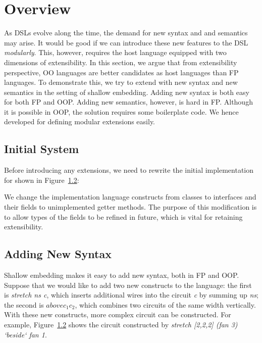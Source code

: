 \section{Overview}

\begin{comment}
Weixin writes this one.

Go over jeremy's examples, maybe having only 3 diagram 
constructs instead of 5 for space reasons.

Use five constructs to show extensibility.

Think of how to introduce our tool? Using the Jeremy's examples? 
or introducing before with some other examples?

\end{comment}

As DSLs evolve along the time, the demand for new syntax and and semantics may arise.
It would be good if we can introduce these new features to the DSL \emph{modularly}.
This, however, requires the host language equipped with two dimensions of
extensibility.
In this section, we argue that from extensibility perspective, OO languages are
better candidates as host languages than FP languages.
To demonstrate this, we try to extend \dsl with new syntax and new semantics in
the setting of shallow embedding. Adding new syntax is both easy for both FP
and OOP. Adding new semantics, however, is hard in FP. Although it is possible
in OOP, the solution requires some boilerplate code. We hence developed \name
for defining modular extensions easily.

\subsection{Initial System}
Before introducing any extensions, we need to rewrite the initial implementation for \dsl shown in Figure~\ref{}:

We change the implementation language constructs from classes to interfaces and
their fields to unimplemented getter methods. The purpose of this modification
is to allow types of the fields to be refined in future, which is vital for
retaining extensibility.

\subsection{Adding New Syntax}
Shallow embedding makes it easy to add new syntax, both in FP and OOP.
Suppose that we would like to add two new constructs to the language:
the first is \emph{stretch ns c}, which inserts additional wires into the circuit \emph{c} by summing up \emph{ns};
the second is $above c_1 c_2$, which combines two circuits of the same width vertically.
With these new constructs, more complex circuit can be constructed.
For example, Figure~\ref{} shows the circuit constructed by \emph{stretch [2,2,2] (fan 3) `beside` fan 1}.

